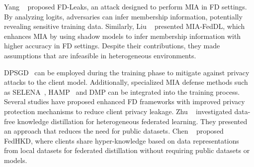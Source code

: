 Yang \etal~\cite{yang2022fd} proposed FD-Leaks, an attack designed to perform MIA in FD settings.
By analyzing logits, adversaries can infer membership information, potentially revealing sensitive training data.
Similarly, Liu \etal~\cite{liu2023mia} presented MIA-FedDL, which enhances MIA by using shadow models to infer membership information with higher accuracy in FD settings.
Despite their contributions, they made assumptions that are infeasible in heterogeneous environments.
\fi

DPSGD~\cite{abadi2016deep} can be employed during the training phase to mitigate against privacy attacks to the client model. 
Additionally, specialized MIA defense methods such as SELENA~\cite{tang2022mitigating}, HAMP~\cite{chen2023overconfidence} and DMP\cite{shejwalkar2021membership} can be integrated into the training process.
Several studies have proposed enhanced FD frameworks with improved privacy protection mechanisms to reduce client privacy leakage.
Zhu \etal~\cite{zhu2021data} investigated data-free knowledge distillation for heterogeneous federated learning.
They presented an approach that reduces the need for public datasets.
Chen \etal~\cite{chen2023best} proposed FedHKD, where clients share hyper-knowledge based on data representations from local datasets for federated distillation without requiring public datasets or models.


